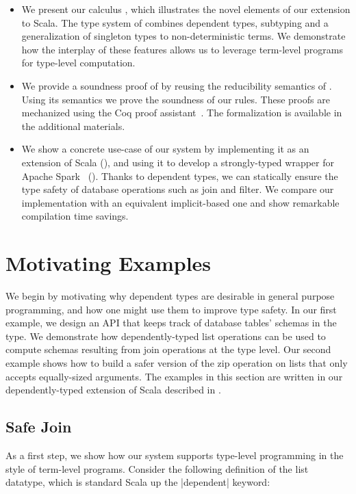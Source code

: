 \begin{itemize}
\item
  We present our calculus \oursystem, which illustrates the novel elements of our extension to Scala.
  The type system of \oursystem combines dependent types, subtyping and a generalization of singleton types to non-deterministic terms.
  We demonstrate how the interplay of these features allows us to leverage term-level programs for type-level computation.
\item
  We provide a soundness proof of \oursystem by reusing the reducibility semantics of \FR \citep{hamza2019system}.
  Using its semantics we prove the soundness of our rules.
  These proofs are mechanized using the Coq proof assistant~\citep{bertot2004interactive}.
  The formalization is available in the additional materials.
\item
  We show a concrete use-case of our system by implementing it as an extension of Scala (), and using it to develop a strongly-typed wrapper for Apache Spark~\citep{zaharia2016apache} ().
  Thanks to dependent types, we can statically ensure the type safety of database operations such as join and filter.
  We compare our implementation with an equivalent implicit-based one and show remarkable compilation time savings.
\end{itemize}

\section{Motivating Examples}
\label{sec:motivating-example}

We begin by motivating why dependent types are desirable in general purpose programming, and how one might use them to improve type safety.
In our first example, we design an API that keeps track of database tables' schemas in the type.
We demonstrate how dependently-typed list operations can be used to compute schemas resulting from join operations at the type level.
Our second example shows how to build a safer version of the zip operation on lists that only accepts equally-sized arguments.
The examples in this section are written in our dependently-typed extension of Scala described in .

\subsection{Safe Join}

As a first step, we show how our system supports type-level programming in the style of term-level programs.
Consider the following definition of the list datatype, which is standard Scala up the |dependent| keyword:


